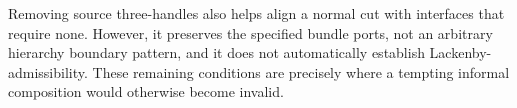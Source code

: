 Removing source three-handles also helps align a normal cut with interfaces
that require none. However, it preserves the specified bundle ports, not
an arbitrary hierarchy boundary pattern, and it does not automatically
establish Lackenby-admissibility. These remaining conditions are precisely
where a tempting informal composition would otherwise become invalid.

